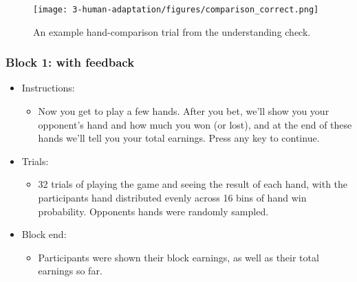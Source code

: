 \begin{figure}
\centering
\texttt{[image: 3-human-adaptation/figures/comparison\_correct.png]}
\caption{An example hand-comparison trial from the understanding check.} \label{fig:appdx_human_comparison_trial}
\end{figure}

\subsubsection{Block 1: with feedback}
\begin{itemize}
\item Instructions:
    \begin{itemize}
    \item Now you get to play a few hands. After you bet, we'll show you your opponent's hand and how much you won (or lost), and at the end of these hands we'll tell you your total earnings. Press any key to continue.
    \end{itemize}

\item Trials:
    \begin{itemize}
    \item 32 trials of playing the game and seeing the result of each hand, with the participants hand distributed evenly across 16 bins of hand win probability. Opponents hands were randomly sampled. 
    \end{itemize}
\item Block end:
    \begin{itemize}
    \item Participants were shown their block earnings, as well as their total earnings so far.
    \end{itemize}
\end{itemize}

